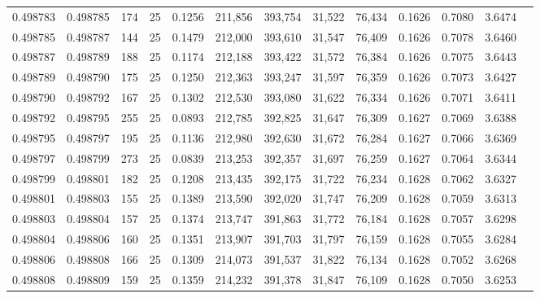 \begin{tabular}{rrrrrrrrrrrrr}
0.498783 & 0.498785 & 174 &  25 &                                     0.1256 & 211,856 & 393,754 &  31,522 &  76,434 & 0.1626 & 0.7080 & 3.6474 \\
0.498785 & 0.498787 & 144 &  25 &                                     0.1479 & 212,000 & 393,610 &  31,547 &  76,409 & 0.1626 & 0.7078 & 3.6460 \\
0.498787 & 0.498789 & 188 &  25 &                                     0.1174 & 212,188 & 393,422 &  31,572 &  76,384 & 0.1626 & 0.7075 & 3.6443 \\
0.498789 & 0.498790 & 175 &  25 &                                     0.1250 & 212,363 & 393,247 &  31,597 &  76,359 & 0.1626 & 0.7073 & 3.6427 \\
0.498790 & 0.498792 & 167 &  25 &                                     0.1302 & 212,530 & 393,080 &  31,622 &  76,334 & 0.1626 & 0.7071 & 3.6411 \\
0.498792 & 0.498795 & 255 &  25 &                                     0.0893 & 212,785 & 392,825 &  31,647 &  76,309 & 0.1627 & 0.7069 & 3.6388 \\
0.498795 & 0.498797 & 195 &  25 &                                     0.1136 & 212,980 & 392,630 &  31,672 &  76,284 & 0.1627 & 0.7066 & 3.6369 \\
0.498797 & 0.498799 & 273 &  25 &                                     0.0839 & 213,253 & 392,357 &  31,697 &  76,259 & 0.1627 & 0.7064 & 3.6344 \\
0.498799 & 0.498801 & 182 &  25 &                                     0.1208 & 213,435 & 392,175 &  31,722 &  76,234 & 0.1628 & 0.7062 & 3.6327 \\
0.498801 & 0.498803 & 155 &  25 &                                     0.1389 & 213,590 & 392,020 &  31,747 &  76,209 & 0.1628 & 0.7059 & 3.6313 \\
0.498803 & 0.498804 & 157 &  25 &                                     0.1374 & 213,747 & 391,863 &  31,772 &  76,184 & 0.1628 & 0.7057 & 3.6298 \\
0.498804 & 0.498806 & 160 &  25 &                                     0.1351 & 213,907 & 391,703 &  31,797 &  76,159 & 0.1628 & 0.7055 & 3.6284 \\
0.498806 & 0.498808 & 166 &  25 &                                     0.1309 & 214,073 & 391,537 &  31,822 &  76,134 & 0.1628 & 0.7052 & 3.6268 \\
0.498808 & 0.498809 & 159 &  25 &                                     0.1359 & 214,232 & 391,378 &  31,847 &  76,109 & 0.1628 & 0.7050 & 3.6253 \\

\end{tabular}
